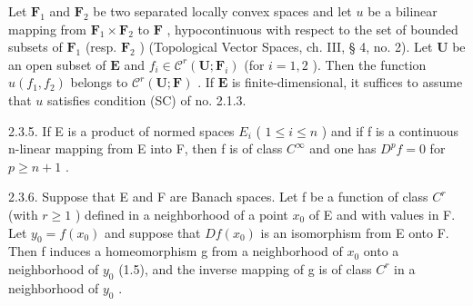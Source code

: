 Let \(\mathbf{F}_1\) and \(\mathbf{F}_2\) be two separated locally convex spaces and let \(u\) be a bilinear mapping from \(\mathbf{F}_1 \times \mathbf{F}_2\) to \(\mathbf{F}\) , hypocontinuous with respect to the set of bounded subsets of \(\mathbf{F}_1\) (resp. \(\mathbf{F}_2\) ) (Topological Vector Spaces, ch. III, § 4, no. 2). Let \(\mathbf{U}\) be an open subset of \(\mathbf{E}\) and \(f_i \in \mathcal{C}^r(\mathbf{U};\mathbf{F}_i)\) (for \(i = 1,2\) ). Then the function \(u(f_1,f_2)\) belongs to \(\mathcal{C}^r(\mathbf{U};\mathbf{F})\) . If \(\mathbf{E}\) is finite-dimensional, it suffices to assume that \(u\) satisfies condition (SC) of no. 2.1.3.

2.3.5. If E is a product of normed spaces \(E_{i}\) ( \(1 \leqslant i \leqslant n\) ) and if f is a continuous n-linear mapping from E into F, then f is of class \(C^{\infty}\) and one has \(D^{p}f = 0\) for \(p \geqslant n + 1\) .

2.3.6. Suppose that E and F are Banach spaces. Let f be a function of class \(C^{r}\) (with \(r \geqslant 1\) ) defined in a neighborhood of a point \(x_{0}\) of E and with values in F. Let \(y_{0} = f(x_{0})\) and suppose that \(Df(x_{0})\) is an isomorphism from E onto F. Then f induces a homeomorphism g from a neighborhood of \(x_{0}\) onto a neighborhood of \(y_{0}\) (1.5), and the inverse mapping of g is of class \(C^{r}\) in a neighborhood of \(y_{0}\) .

